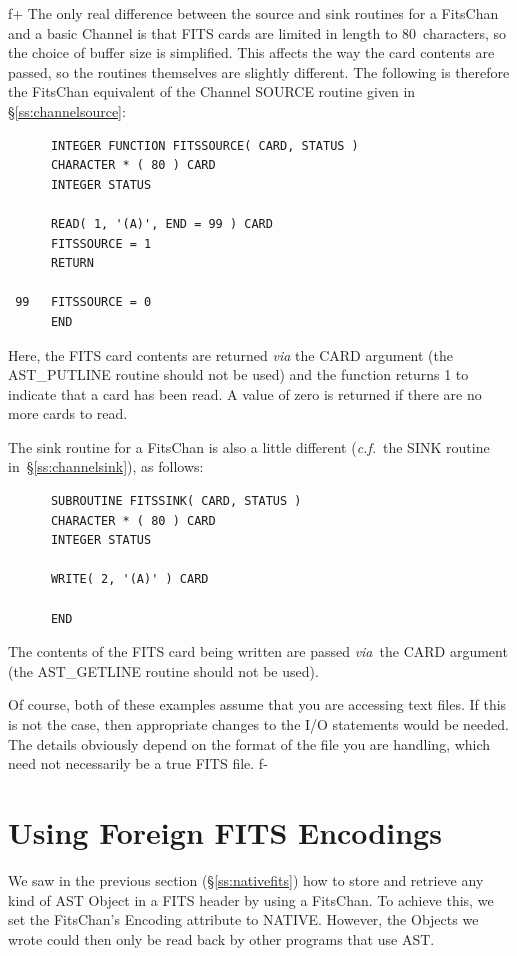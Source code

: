 \documentclass[twoside,11pt]{article}
\newcommand{\secref}[1]{\S\ref{#1}}
\newcommand{\secref}[1]{\ref{#1}}
\begin{document}
f+
The only real difference between the source and sink routines for a
FitsChan and a basic Channel is that FITS cards are limited in length
to 80~characters, so the choice of buffer size is simplified.  This
affects the way the card contents are passed, so the routines
themselves are slightly different.  The following is therefore the
FitsChan equivalent of the Channel SOURCE routine given in
\secref{ss:channelsource}:

\small
\begin{verbatim}
      INTEGER FUNCTION FITSSOURCE( CARD, STATUS )
      CHARACTER * ( 80 ) CARD
      INTEGER STATUS

      READ( 1, '(A)', END = 99 ) CARD
      FITSSOURCE = 1
      RETURN

 99   FITSSOURCE = 0
      END
\end{verbatim}
\normalsize

Here, the FITS card contents are returned {\em{via}} the CARD argument
(the AST\_PUTLINE routine should not be used) and the function returns
1 to indicate that a card has been read. A value of zero is returned
if there are no more cards to read.

The sink routine for a FitsChan is also a little different
({\em{c.f.}}\ the SINK routine in~\secref{ss:channelsink}), as
follows:

\small
\begin{verbatim}
      SUBROUTINE FITSSINK( CARD, STATUS )
      CHARACTER * ( 80 ) CARD
      INTEGER STATUS

      WRITE( 2, '(A)' ) CARD

      END
\end{verbatim}
\normalsize

The contents of the FITS card being written are passed {\em{via}}\ the
CARD argument (the AST\_GETLINE routine should not be used).

Of course, both of these examples assume that you are accessing text
files. If this is not the case, then appropriate changes to the I/O
statements would be needed.  The details obviously depend on the
format of the file you are handling, which need not necessarily be a
true FITS file.
f-

\cleardoublepage
\section{\label{ss:foreignfits}Using Foreign FITS Encodings}

We saw in the previous section (\secref{ss:nativefits}) how to store
and retrieve any kind of AST Object in a FITS header by using a
FitsChan. To achieve this, we set the FitsChan's Encoding attribute to
NATIVE. However, the Objects we wrote could then only be read back by
other programs that use AST.
\end{document}
